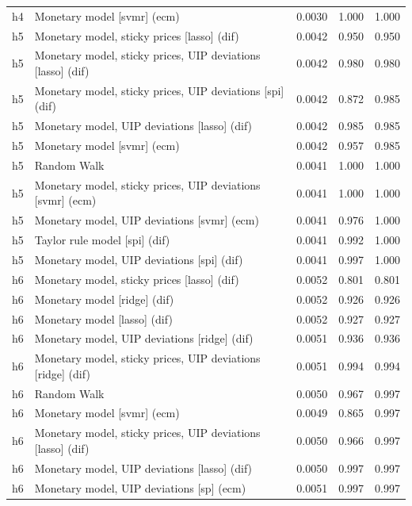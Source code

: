 \begin{ThreePartTable}
\begin{longtable}[t]{cp{5.5cm}ccc}
h4 & \raggedright Monetary model [svmr] (ecm) & 0.0030 & 1.000 & 1.000\\
\addlinespace
h5 & \raggedright Monetary model, sticky prices [lasso] (dif) & 0.0042 & 0.950 & 0.950\\
h5 & \raggedright Monetary model, sticky prices, UIP deviations [lasso] (dif) & 0.0042 & 0.980 & 0.980\\
h5 & \raggedright Monetary model, sticky prices, UIP deviations [spi] (dif) & 0.0042 & 0.872 & 0.985\\
h5 & \raggedright Monetary model, UIP deviations [lasso] (dif) & 0.0042 & 0.985 & 0.985\\
h5 & \raggedright Monetary model [svmr] (ecm) & 0.0042 & 0.957 & 0.985\\
h5 & \raggedright Random Walk & 0.0041 & 1.000 & 1.000\\
h5 & \raggedright Monetary model, sticky prices, UIP deviations [svmr] (ecm) & 0.0041 & 1.000 & 1.000\\
h5 & \raggedright Monetary model, UIP deviations [svmr] (ecm) & 0.0041 & 0.976 & 1.000\\
h5 & \raggedright Taylor rule model [spi] (dif) & 0.0041 & 0.992 & 1.000\\
h5 & \raggedright Monetary model, UIP deviations [spi] (dif) & 0.0041 & 0.997 & 1.000\\
\addlinespace
h6 & \raggedright Monetary model, sticky prices [lasso] (dif) & 0.0052 & 0.801 & 0.801\\
h6 & \raggedright Monetary model [ridge] (dif) & 0.0052 & 0.926 & 0.926\\
h6 & \raggedright Monetary model [lasso] (dif) & 0.0052 & 0.927 & 0.927\\
h6 & \raggedright Monetary model, UIP deviations [ridge] (dif) & 0.0051 & 0.936 & 0.936\\
h6 & \raggedright Monetary model, sticky prices, UIP deviations [ridge] (dif) & 0.0051 & 0.994 & 0.994\\
h6 & \raggedright Random Walk & 0.0050 & 0.967 & 0.997\\
h6 & \raggedright Monetary model [svmr] (ecm) & 0.0049 & 0.865 & 0.997\\
h6 & \raggedright Monetary model, sticky prices, UIP deviations [lasso] (dif) & 0.0050 & 0.966 & 0.997\\
h6 & \raggedright Monetary model, UIP deviations [lasso] (dif) & 0.0050 & 0.997 & 0.997\\
h6 & \raggedright Monetary model, UIP deviations [sp] (ecm) & 0.0051 & 0.997 & 0.997\\

\end{longtable}
\end{ThreePartTable}
